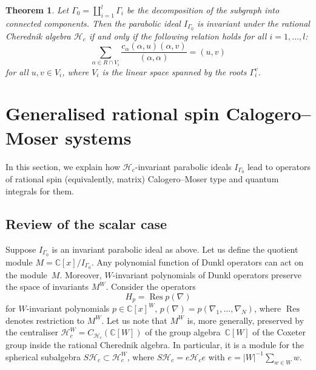 \documentclass[12pt]{amsart}
\newcommand{\cH}{\mathcal{H}}
\DeclareMathOperator{\Res}{Res}
\numberwithin{equation}{section}
\newtheorem{theorem}{Theorem}[section]
\theoremstyle{definition}
\begin{document}
\begin{theorem} \cite{Feigin}
    \label{invariance}
    Let $\Gamma_0 = \coprod_{i = 1}^l \Gamma_i$ be the decomposition of the subgraph into connected components. Then the parabolic ideal $I_{\Gamma_0}$ is invariant under the rational Cherednik algebra $\cH_c$ if and only if the following relation holds for all $i=1, \dots, l$:
    \begin{equation*}
        \sum\limits_{\alpha \in R \cap V_i} \frac{c_{\alpha} (\alpha , u) (\alpha, v)}{(\alpha, \alpha)} = (u, v)
    \end{equation*}
    for all $u,v \in V_i$, where $V_i$ is the linear space spanned by the roots $\Gamma_i^v$.
\end{theorem}



\section{Generalised rational spin Calogero--Moser systems}\label{rational case} 

In this section, we explain how $\cH_c$-invariant parabolic ideals $I_{\Gamma_0}$ lead to operators of rational spin (equivalently, matrix) Calogero--Moser type and quantum integrals for them.

\subsection{Review of the scalar case}

Suppose $I_{\Gamma_0}$ is an invariant parabolic ideal as above. Let us define the quotient module 
$M = \mathbb{C}[x]/I_{\Gamma_0}$. Any polynomial function of Dunkl operators can act on the module~$M$. Moreover, $W$-invariant polynomials of Dunkl operators preserve the space of invariants $M^{W}$. Consider the operators
\begin{equation*}
    H_p = \Res p(\nabla)
\end{equation*}
for $W$-invariant polynomials $p \in \mathbb{C}[x]^W$, $p(\nabla) = p(\nabla_1, \ldots, \nabla_N)$, where $\Res$ denotes restriction to $M^W$. Let us note that $M^W$ is, more generally, preserved by
the centraliser $\cH_c^W=C_{\cH_c}(\mathbb{C}[W])$ of the group algebra~$\mathbb{C}[W]$ of the Coxeter group inside the rational Cherednik algebra. In particular, it is a module for the spherical subalgebra $S\cH_c \subset \cH_c^W$, where $S\cH_c = e\cH_ce$ with $e = |W|^{-1} \sum_{w \in W}w$. 
\end{document}
